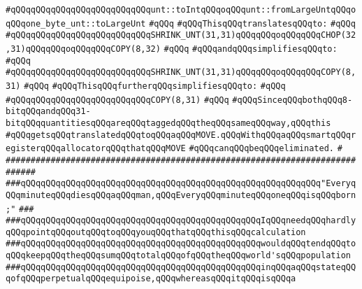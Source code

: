 \verb|#qQQqqQQqqQQqqQQqqQQqqQQqqQQqunt::toIntqQQqoqQQqunt::fromLargeUntqQQqoqQQqone_byte_unt::toLargeUnt|\newline
\verb|#qQQq|\newline
\verb|#qQQqThisqQQqtranslatesqQQqto:|\newline
\verb|#qQQq|\newline
\verb|#qQQqqQQqqQQqqQQqqQQqqQQqqQQqSHRINK_UNT(31,31)qQQqqQQqoqQQqqQQqCHOP(32,31)qQQqqQQqoqQQqqQQqCOPY(8,32)|\newline
\verb|#qQQq|\newline
\verb|#qQQqandqQQqsimplifiesqQQqto:|\newline
\verb|#qQQq|\newline
\verb|#qQQqqQQqqQQqqQQqqQQqqQQqqQQqSHRINK_UNT(31,31)qQQqqQQqoqQQqqQQqCOPY(8,31)|\newline
\verb|#qQQq|\newline
\verb|#qQQqThisqQQqfurtherqQQqsimplifiesqQQqto:|\newline
\verb|#qQQq|\newline
\verb|#qQQqqQQqqQQqqQQqqQQqqQQqqQQqCOPY(8,31)|\newline
\verb|#qQQq|\newline
\verb|#qQQqSinceqQQqbothqQQq8-bitqQQqandqQQq31-bitqQQqquantitiesqQQqareqQQqtaggedqQQqtheqQQqsameqQQqway,qQQqthis|\newline
\verb|#qQQqgetsqQQqtranslatedqQQqtoqQQqaqQQqMOVE.qQQqWithqQQqaqQQqsmartqQQqregisterqQQqallocatorqQQqthatqQQqMOVE|\newline
\verb|#qQQqcanqQQqbeqQQqeliminated.|\newline
\verb|#|\newline
\verb|############################################################################|\newline
\newline
\newline
\verb|###qQQqqQQqqQQqqQQqqQQqqQQqqQQqqQQqqQQqqQQqqQQqqQQqqQQqqQQqqQQq"EveryqQQqminuteqQQqdiesqQQqaqQQqman,qQQqEveryqQQqminuteqQQqoneqQQqisqQQqborn;"|\newline
\verb|###|\newline
\verb|###qQQqqQQqqQQqqQQqqQQqqQQqqQQqqQQqqQQqqQQqqQQqqQQqIqQQqneedqQQqhardlyqQQqpointqQQqoutqQQqtoqQQqyouqQQqthatqQQqthisqQQqcalculation|\newline
\verb|###qQQqqQQqqQQqqQQqqQQqqQQqqQQqqQQqqQQqqQQqqQQqqQQqwouldqQQqtendqQQqtoqQQqkeepqQQqtheqQQqsumqQQqtotalqQQqofqQQqtheqQQqworld'sqQQqpopulation|\newline
\verb|###qQQqqQQqqQQqqQQqqQQqqQQqqQQqqQQqqQQqqQQqqQQqqQQqinqQQqaqQQqstateqQQqofqQQqperpetualqQQqequipoise,qQQqwhereasqQQqitqQQqisqQQqa|\newline
